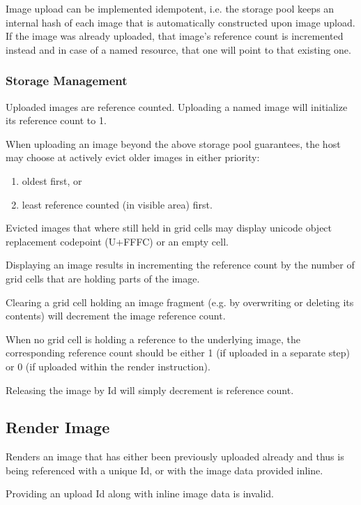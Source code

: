 \documentclass{article}
\begin{document}
Image upload can be implemented idempotent, i.e. the storage pool keeps an internal hash
of each image that is automatically constructed upon image upload.
If the image was already uploaded, that image's reference count is incremented instead
and in case of a named resource, that one will point to that existing one.

\subsubsection{Storage Management}

Uploaded images are reference counted. Uploading a named image will initialize its reference count to 1.

When uploading an image beyond the above storage pool guarantees,
the host may choose at actively evict older images in either priority:

\begin{enumerate}
    \item oldest first, or
    \item least reference counted (in visible area) first.
\end{enumerate}

Evicted images that where still held in grid cells may display unicode object replacement
codepoint (U+FFFC) or an empty cell.

Displaying an image results in incrementing the reference count by the number of grid cells
that are holding parts of the image.

Clearing a grid cell holding an image fragment (e.g. by overwriting or deleting its contents)
will decrement the image reference count.

When no grid cell is holding a reference to the underlying image,
the corresponding reference count should be either 1 (if uploaded in a separate step)
or 0 (if uploaded within the render instruction).

Releasing the image by Id will simply decrement is reference count.

\subsection{Render Image}

Renders an image that has either been previously uploaded already and thus is being referenced
with a unique Id, or with the image data provided inline.

Providing an upload Id along with inline image data is invalid.
\end{document}
